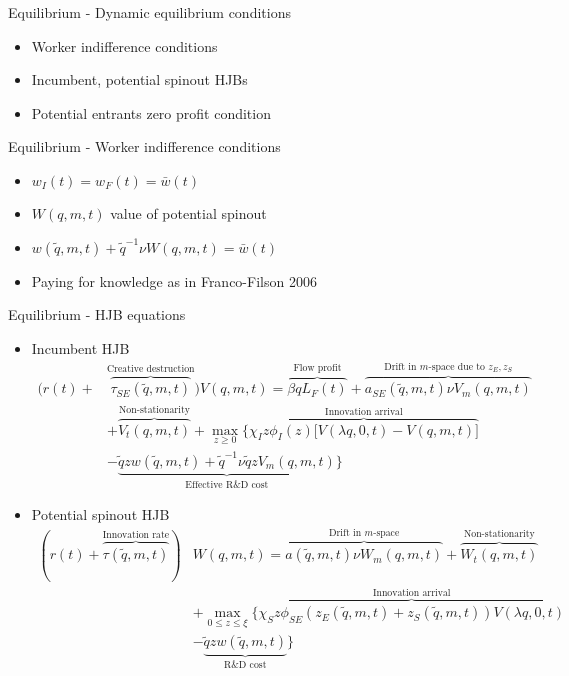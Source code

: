\documentclass[english,usenames,dvipsnames]{beamer}
\begin{document}
\begin{frame}{Equilibrium - Dynamic equilibrium conditions}
\begin{itemize}
	\item Worker indifference conditions
	\item Incumbent, potential spinout HJBs
	\item Potential entrants zero profit condition
\end{itemize}
\end{frame}

\begin{frame}{Equilibrium - Worker indifference conditions}
\begin{itemize}
	\item $w_I(t) = w_F(t) = \bar{w}(t)$
	\item $W(q,m,t)$ value of potential spinout
	\item $w(\tilde{q},m,t) + \tilde{q}^{-1} \nu W(q,m,t) = \bar{w}(t)$
	\item \alert{Paying for knowledge} as in Franco-Filson 2006
\end{itemize}
\end{frame}

\begin{frame}{Equilibrium - HJB equations}
\begin{itemize}
	\item Incumbent HJB
	\footnotesize
	\begin{align*}
	(r(t) + &\overbrace{\tau_{SE}(\tilde{q},m,t)}^{\textrm{Creative destruction}}) V(q,m,t) = \overbrace{\beta q L_F(t)}^{\textrm{Flow profit}} + \overbrace{a_{SE}(\tilde{q},m,t) \nu V_m(q,m,t)}^{\textrm{Drift in $m$-space due to $z_E,z_S$}} \\
	& + \overbrace{V_t(q,m,t)}^{\textrm{Non-stationarity}} + \max_{z \ge 0} \Big \{ \overbrace{\chi_I z \phi_I(z)\big[V(\lambda q,0,t) - V(q,m,t) \big] }^{\textrm{Innovation arrival}}\\
	& - \underbrace{\tilde{q}z w(\tilde{q},m,t) + \tilde{q}^{-1} \nu \tilde{q} z V_m(q,m,t)}_{\textrm{Effective R\&D cost}}\Big\}
	\end{align*}
	\normalsize
	\item Potential spinout HJB
	\footnotesize
	\begin{align*}
	(r(t) + \overbrace{\tau(\tilde{q},m,t)}^{\textrm{Innovation rate}}) &W(q,m,t) = \overbrace{a(\tilde{q},m,t) \nu W_m(q,m,t)}^{\textrm{Drift in $m$-space}} + \overbrace{W_t(q,m,t)}^{\textrm{Non-stationarity}} \\
	&+ \max_{0 \le z \le \xi} \Big \{ \overbrace{\chi_S z \phi_{SE}(z_E(\tilde{q},m,t) + z_S(\tilde{q},m,t)) V(\lambda q,0,t)}^{\textrm{Innovation arrival}} \\
	& - \underbrace{\tilde{q}z w(\tilde{q},m,t)}_{\textrm{R\&D cost}}\Big\}
	\end{align*}
\end{itemize}
\end{frame}
\end{document}

